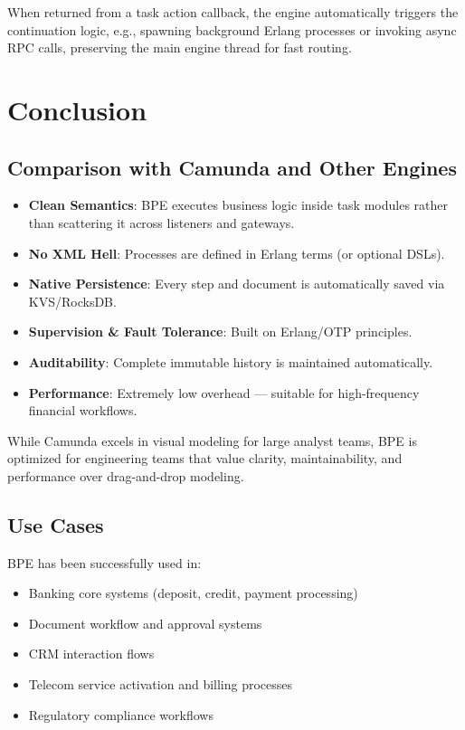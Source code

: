 \documentclass[11pt,a4paper]{article}
\begin{document}
When returned from a task action callback, the engine automatically triggers the continuation logic, e.g., spawning background Erlang processes or invoking async RPC calls, preserving the main engine thread for fast routing.

\newpage
\section{Conclusion}

\subsection{Comparison with Camunda and Other Engines}

\begin{itemize}
    \item \textbf{Clean Semantics}: BPE executes business logic inside task modules rather than scattering it across listeners and gateways.
    \item \textbf{No XML Hell}: Processes are defined in Erlang terms (or optional DSLs).
    \item \textbf{Native Persistence}: Every step and document is automatically saved via KVS/RocksDB.
    \item \textbf{Supervision \& Fault Tolerance}: Built on Erlang/OTP principles.
    \item \textbf{Auditability}: Complete immutable history is maintained automatically.
    \item \textbf{Performance}: Extremely low overhead — suitable for high-frequency financial workflows.
\end{itemize}

While Camunda excels in visual modeling for large analyst teams, BPE is optimized for engineering teams that value clarity,
maintainability, and performance over drag-and-drop modeling.

\newpage
\subsection{Use Cases}

BPE has been successfully used in:
\begin{itemize}
    \item Banking core systems (deposit, credit, payment processing)
    \item Document workflow and approval systems
    \item CRM interaction flows
    \item Telecom service activation and billing processes
    \item Regulatory compliance workflows
\end{itemize}
\end{document}
